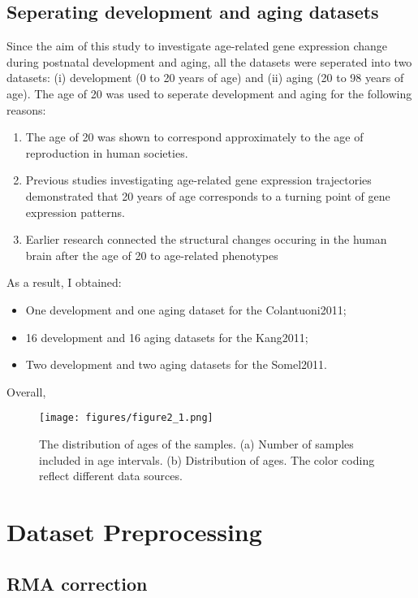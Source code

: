 \subsection{Seperating development and aging datasets}
Since the aim of this study to investigate age-related gene expression change during postnatal development and aging, all the datasets were seperated into two datasets: (i) development (0 to 20 years of age) and  (ii) aging (20 to 98 years of age).
The age of 20 was used to seperate development and aging for the following reasons:
\begin{enumerate}
    \item The age of 20 was shown to correspond approximately to the age of reproduction in human societies\cite{Walker2006}.
    \item Previous studies investigating age-related gene expression trajectories demonstrated that 20 years of age corresponds to a turning point of gene expression patterns\cite{Colantuoni2011, Donertas2017,Somel2010}.
    \item Earlier research connected the structural changes occuring in the human brain after the age of 20 to age-related phenotypes\cite{Sowell2004}
\end{enumerate}

As a result, I obtained:
\begin{itemize}
    \item One development and one aging dataset for the Colantuoni2011;
    \item 16 development and 16 aging datasets for the Kang2011;
    \item Two development and two aging datasets for the Somel2011.
\end{itemize}
Overall, 

\begin{figure}[h]
\centering
\texttt{[image: figures/figure2\_1.png]}
\caption{The distribution of ages of the samples. (a) Number of samples included in age intervals. (b) Distribution of ages. The color coding reflect different data sources. }\label{fig:fig2.1}
\end{figure}


\section{Dataset Preprocessing}

\subsection{RMA correction}

